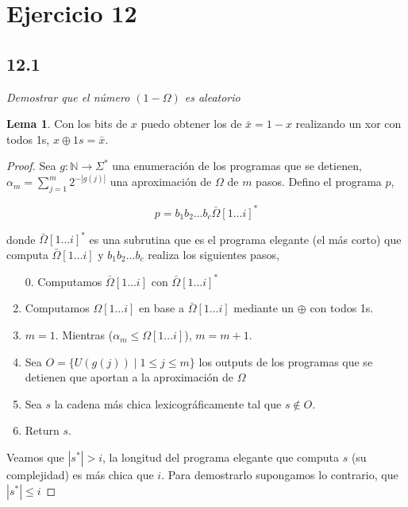 \documentclass{article}
\theoremstyle{definition} %
\newtheorem{lemma}{Lema}
\newcommand{\first}[2]{#2[1 \dots #1]}
\begin{document}
\section*{Ejercicio 12}

\subsection*{12.1}

\textit{Demostrar que el número $(1 - \Omega)$ es aleatorio}

\begin{lemma}\label{lemma:xor-bits}
    Con los bits de $x$ puedo obtener los de $\bar{x} = 1 - x$ realizando un xor con
    todos 1s, $x \oplus 1s = \bar{x}$.
\end{lemma}

\begin{proof}
    Sea $g: \mathbb{N} \to \Sigma^*$ una enumeración de los programas que se
    detienen, $\alpha_m = \sum_{j = 1}^{m} 2 ^ {-|g(j)|}$ una aproximación de
    $\Omega$ de $m$ pasos. Defino el programa $p$,

    \[
        p = b_1 b_2 \dots b_c \first{i}{\bar{\Omega}}^*
    \]

    donde $\first{i}{\bar{\Omega}}^*$ es una subrutina que es el programa
    elegante (el más corto) que computa $\first{i}{\bar{\Omega}}$ y $b_1 b_2
    \dots b_c$ realiza los siguientes pasos,

    \begin{enumerate}
        \item[0.] Computamos $\first{i}{\bar{\Omega}}$ con
        $\first{i}{\bar{\Omega}}^*$
        \item Computamos $\first{i}{\Omega}$ en base a
        $\first{i}{\bar{\Omega}}$ mediante un $\oplus$ con todos 1s.
        \item $m = 1$. Mientras ($\alpha_m \leq \first{i}{\Omega}$), $m = m + 1$.
        \item Sea $O = \{ U(g(j)) \mid 1 \leq j \leq m \}$ los outputs de los
        programas que se detienen que aportan a la aproximación de $\Omega$
        \item Sea $s$ la cadena más chica lexicográficamente tal que $s \notin O$.
        \item Return $s$.
    \end{enumerate}

    Veamos que $|s^*| > i$, la longitud del programa elegante que computa $s$
    (su complejidad) es más chica que $i$. Para demostrarlo supongamos lo
    contrario, que $|s^*| \leq i$


\end{proof}
\end{document}
